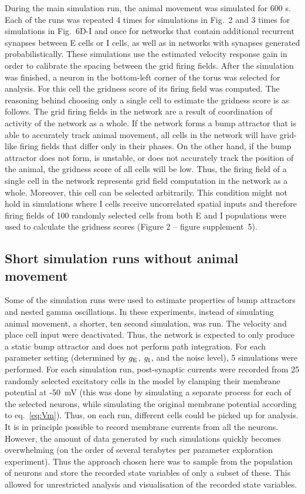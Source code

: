 \documentclass[a4paper,12pt]{article}
\newcommand{\ssc}[3]{\ensuremath{#1_{\text{#2}_{\text{#3}}}}}
\newcommand{\gE      }{\ssc{g}      {\scriptsize{E}}{}}
\newcommand{\gI      }{\ssc{g}      {\scriptsize{I}}{}}
\begin{document}
During the main simulation run, the animal movement was simulated for 600 s.
Each of the runs was repeated 4 times for simulations in Fig.~2 and 3 times
for simulations in Fig.~6D-I and once for networks that contain additional
recurrent synapses between E cells or I cells, as well as in networks with
synapses generated probabilistically. These simulations use the estimated velocity
response gain in order to calibrate the spacing between the grid firing fields.
After the simulation was finished, a neuron in the bottom-left corner of the
torus was selected for analysis. For this cell the gridness score of its firing
field was computed. The reasoning behind choosing only a single cell to estimate
the gridness score is as follows. The grid firing fields in the network are a
result of coordination of activity of the network as a whole. If the network
forms a bump attractor that is able to accurately track animal movement, all
cells in the network will have grid-like firing fields that differ only in
their phases. On the other hand, if the bump attractor does not form, is
unstable, or does not accurately track the position of the animal, the gridness
score of all cells will be low.  Thus, the firing field of a single cell in the
network represents grid field computation in the network as a whole.  Moreover,
this cell can be selected arbitrarily. This condition might not hold in
simulations where I cells receive uncorrelated spatial inputs and therefore
firing fields of 100 randomly selected cells from both E and I populations were
used to calculate the gridness scores (Figure 2 -- figure
supplement~5).


\subsection{Short simulation runs without animal movement} \label{sec:noise_short_sims}

Some of the simulation runs were used to estimate properties of bump attractors
and nested gamma oscillations. 
In these experiments, instead of simulating animal movement, a shorter, ten
second simulation, was run. The velocity and place cell input were deactivated.
Thus, the network is expected to only produce a static bump attractor and does
not perform path integration. For each parameter setting (determined
by $\gE$, $\gI$, and the noise level), 5 simulations were performed.  For each
simulation run, post-synaptic currents were recorded from 25 randomly selected
excitatory cells in the model by clamping their membrane potential at
-50~mV (this was done by simulating a separate process for each of the selected
neurons, while simulating the original membrane potential according to
eq.~\eqref{eq:Vm}).
Thus, on each run, different cells could be
picked up for analysis. It is in principle possible to record membrane currents
from all the neurons. However, the amount of data generated by such simulations
quickly becomes overwhelming (on the order of several terabytes per
parameter exploration experiment). Thus the approach chosen here was to sample from
the population of neurons and store the recorded state variables of only a
subset of these. This allowed for unrestricted analysis and visualisation of
the recorded state variables.
\end{document}
